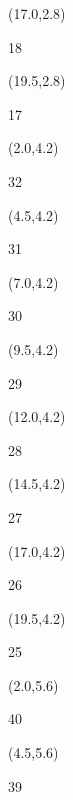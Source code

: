 \documentclass[a4paper]{article}
\newcommand{\myseat}[5]{%
\vspace{-0.1cm} \hspace{-0.5cm}
\parbox[t][2.2cm][t]{3.5cm}{%
\small #1 %
\begin{description}
\vspace{-0.1cm}
\item [ID:] #2
\vspace{-0.1cm}
\item [Team:] #3 \normalsize
\vspace{-0.1cm}
\item \normalsize #4 #5
\vspace{-0.1cm}
\end{description}
}
}
\begin{document}
\begin{CJK}{UTF8}{cyberbit}
\begin{textblock}{2.5}(17.0,2.8)
\textblockcolor{}
\myseat{18}{}{}{}{}
\end{textblock}

\begin{textblock}{2.5}(19.5,2.8)
\textblockcolor{}
\myseat{17}{}{}{}{}
\end{textblock}


\begin{textblock}{2.5}(2.0,4.2)
\textblockcolor{}
\myseat{32}{}{}{}{}
\end{textblock}

\begin{textblock}{2.5}(4.5,4.2)
\textblockcolor{}
\myseat{31}{}{}{}{}
\end{textblock}

\begin{textblock}{2.5}(7.0,4.2)
\textblockcolor{}
\myseat{30}{}{}{}{}
\end{textblock}

\begin{textblock}{2.5}(9.5,4.2)
\textblockcolor{}
\myseat{29}{}{}{}{}
\end{textblock}

\begin{textblock}{2.5}(12.0,4.2)
\textblockcolor{}
\myseat{28}{}{}{}{}
\end{textblock}

\begin{textblock}{2.5}(14.5,4.2)
\textblockcolor{}
\myseat{27}{}{}{}{}
\end{textblock}

\begin{textblock}{2.5}(17.0,4.2)
\textblockcolor{}
\myseat{26}{}{}{}{}
\end{textblock}

\begin{textblock}{2.5}(19.5,4.2)
\textblockcolor{}
\myseat{25}{}{}{}{}
\end{textblock}


\begin{textblock}{2.5}(2.0,5.6)
\textblockcolor{}
\myseat{40}{}{}{}{}
\end{textblock}

\begin{textblock}{2.5}(4.5,5.6)
\textblockcolor{}
\myseat{39}{}{}{}{}
\end{textblock}


\end{CJK}
\end{document}
